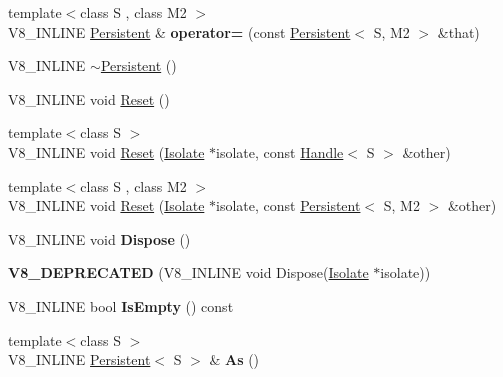\begin{DoxyCompactItemize}
\item 
\hypertarget{classv8_1_1_persistent_a11104ee8739cb1f25e40fd17d746b48f}{}{\footnotesize template$<$class S , class M2 $>$ }\\V8\+\_\+\+I\+N\+L\+I\+N\+E \hyperlink{classv8_1_1_persistent}{Persistent} \& {\bfseries operator=} (const \hyperlink{classv8_1_1_persistent}{Persistent}$<$ S, M2 $>$ \&that)\label{classv8_1_1_persistent_a11104ee8739cb1f25e40fd17d746b48f}

\item 
V8\+\_\+\+I\+N\+L\+I\+N\+E \hyperlink{classv8_1_1_persistent_a7d4d2bebfe3919e447e22adc15464e25}{$\sim$\+Persistent} ()
\item 
V8\+\_\+\+I\+N\+L\+I\+N\+E void \hyperlink{classv8_1_1_persistent_a5912223c89179157015246728223c051}{Reset} ()
\item 
{\footnotesize template$<$class S $>$ }\\V8\+\_\+\+I\+N\+L\+I\+N\+E void \hyperlink{classv8_1_1_persistent_a415a9da7e5a5b89de59503b3619e0358}{Reset} (\hyperlink{classv8_1_1_isolate}{Isolate} $\ast$isolate, const \hyperlink{classv8_1_1_handle}{Handle}$<$ S $>$ \&other)
\item 
{\footnotesize template$<$class S , class M2 $>$ }\\V8\+\_\+\+I\+N\+L\+I\+N\+E void \hyperlink{classv8_1_1_persistent_a276ec37d0314920f811619edc2344736}{Reset} (\hyperlink{classv8_1_1_isolate}{Isolate} $\ast$isolate, const \hyperlink{classv8_1_1_persistent}{Persistent}$<$ S, M2 $>$ \&other)
\item 
\hypertarget{classv8_1_1_persistent_a32d27a10a5e8b9eea09dcbdf487d1240}{}V8\+\_\+\+I\+N\+L\+I\+N\+E void {\bfseries Dispose} ()\label{classv8_1_1_persistent_a32d27a10a5e8b9eea09dcbdf487d1240}

\item 
\hypertarget{classv8_1_1_persistent_ac29be61f25dad17106026f909be3afdd}{}{\bfseries V8\+\_\+\+D\+E\+P\+R\+E\+C\+A\+T\+E\+D} (V8\+\_\+\+I\+N\+L\+I\+N\+E void Dispose(\hyperlink{classv8_1_1_isolate}{Isolate} $\ast$isolate))\label{classv8_1_1_persistent_ac29be61f25dad17106026f909be3afdd}

\item 
\hypertarget{classv8_1_1_persistent_ac98fb0185b3800b9d18d3b8927e73fcd}{}V8\+\_\+\+I\+N\+L\+I\+N\+E bool {\bfseries Is\+Empty} () const \label{classv8_1_1_persistent_ac98fb0185b3800b9d18d3b8927e73fcd}

\item 
\hypertarget{classv8_1_1_persistent_a8d2c96e559ac88f6201d98cb2a626808}{}{\footnotesize template$<$class S $>$ }\\V8\+\_\+\+I\+N\+L\+I\+N\+E \hyperlink{classv8_1_1_persistent}{Persistent}$<$ S $>$ \& {\bfseries As} ()\label{classv8_1_1_persistent_a8d2c96e559ac88f6201d98cb2a626808}


\end{DoxyCompactItemize}
